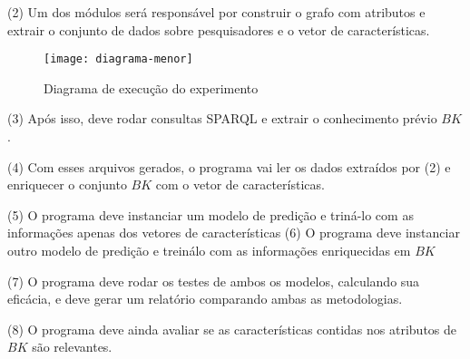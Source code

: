 (2) Um dos módulos será responsável por construir o grafo com atributos e extrair o conjunto de dados sobre pesquisadores e o vetor de características. %

\begin{figure}[!h]
  \centering
  \texttt{[image: diagrama-menor]}
  \caption{Diagrama de execução do experimento}
  \label{fig:diagrama-experimento}
\end{figure}

(3) Após isso, deve rodar consultas SPARQL e extrair o conhecimento prévio $BK$.

(4) Com esses arquivos gerados, o programa vai ler os dados extraídos por (2) e enriquecer o conjunto $BK$ com o vetor de características.

(5) O programa deve instanciar um modelo de predição e triná-lo com as informações apenas dos vetores de características
(6) O programa deve instanciar outro modelo de predição e treinálo com as informações enriquecidas em $BK$

(7) O programa deve rodar os testes de ambos os modelos, calculando sua eficácia, e deve gerar um relatório comparando ambas as metodologias.

(8) O programa deve ainda avaliar se as características contidas nos atributos de $BK$ são relevantes.



